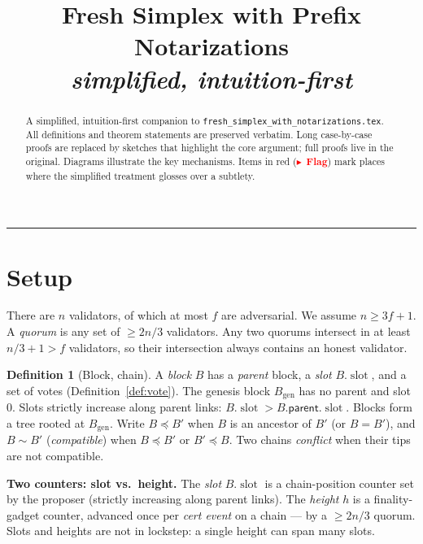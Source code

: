 \documentclass{article}
\title{Fresh Simplex with Prefix Notarizations\\
\large \textit{simplified, intuition-first}}
\author{}
\date{}
\newcommand{\genesis}{\ensuremath{B_{\mathrm{gen}}}}
\newcommand{\slot}{\operatorname{\mathrm{slot}}}
\newcommand{\parent}{\mathsf{parent}}
\theoremstyle{plain}
\theoremstyle{definition}
\newtheorem{definition}[theorem]{Definition}
\theoremstyle{remark}
\renewcommand{\paragraph}[1]{\vspace{6pt}\noindent\textbf{#1}}
\begin{document}
\maketitle

\begin{abstract}
\noindent A simplified, intuition-first companion to \texttt{fresh\_simplex\_with\_notarizations.tex}. All definitions and theorem statements are preserved verbatim. Long case-by-case proofs are replaced by sketches that highlight the core argument; full proofs live in the original. Diagrams illustrate the key mechanisms. Items in red (\textcolor{red}{$\blacktriangleright$~\textbf{Flag}}) mark places where the simplified treatment glosses over a subtlety.
\end{abstract}

\tableofcontents
\medskip\hrule\medskip

\section{Setup}\label{sec:setup}

There are $n$ validators, of which at most $f$ are adversarial. We assume $n \geq 3f + 1$. A \emph{quorum} is any set of $\geq 2n/3$ validators. Any two quorums intersect in at least $n/3 + 1 > f$ validators, so their intersection always contains an honest validator.

\begin{definition}[Block, chain]\label{def:block}
A \emph{block} $B$ has a \emph{parent} block, a \emph{slot} $B.\slot$, and a set of votes (Definition~\ref{def:vote}). The genesis block $\genesis$ has no parent and slot $0$. Slots strictly increase along parent links: $B.\slot > B.\parent.\slot$. Blocks form a tree rooted at $\genesis$. Write $B \preceq B'$ when $B$ is an ancestor of $B'$ (or $B = B'$), and $B \sim B'$ (\emph{compatible}) when $B \preceq B'$ or $B' \preceq B$. Two chains \emph{conflict} when their tips are not compatible.
\end{definition}

\paragraph{Two counters: slot vs.\ height.} The \emph{slot} $B.\slot$ is a chain-position counter set by the proposer (strictly increasing along parent links). The \emph{height} $h$ is a finality-gadget counter, advanced once per \emph{cert event} on a chain --- by a $\geq 2n/3$ quorum. Slots and heights are not in lockstep: a single height can span many slots.
\end{document}
